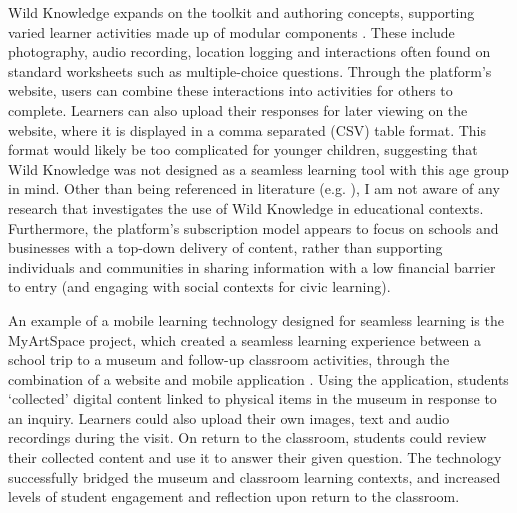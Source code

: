 Wild Knowledge expands on the toolkit and authoring concepts, supporting varied learner activities made up of modular components \citep{WildKnowledge2015}. These include photography, audio recording, location logging and interactions often found on standard worksheets such as multiple-choice questions. Through the platform’s website, users can combine these interactions into activities for others to complete. Learners can also upload their responses for later viewing on the website, where it is displayed in a comma separated (CSV) table format. This format would likely be too complicated for younger children, suggesting that Wild Knowledge was not designed as a seamless learning tool with this age group in mind. Other than being referenced in literature (e.g. \citep{Traxler2013}), I am not aware of any research that investigates the use of Wild Knowledge in educational contexts. Furthermore, the platform’s subscription model appears to focus on schools and businesses with a top-down delivery of content, rather than supporting individuals and communities in sharing information with a low financial barrier to entry (and engaging with social contexts for civic learning).

An example of a mobile learning technology designed for seamless learning is the MyArtSpace project, which created a seamless learning experience between a school trip to a museum and follow-up classroom activities, through the combination of a website and mobile application \citep{Vavoula2009}. Using the application, students `collected’ digital content linked to physical items in the museum in response to an inquiry. Learners could also upload their own images, text and audio recordings during the visit. On return to the classroom, students could review their collected content and use it to answer their given question. The technology successfully bridged the museum and classroom learning contexts, and increased levels of student engagement and reflection upon return to the classroom. 

